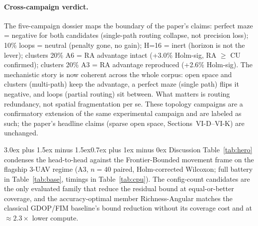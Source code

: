 \documentclass[journal]{IEEEtran}
\makeatletter
\newcommand{\FB}{Frontier-Bounded}
\newcommand{\RA}{Richness-Angular}
\renewcommand{\section}{\@startsection{section}{1}{\z@}%
{3.0ex plus 1.5ex minus 1.5ex}{0.7ex plus 1ex minus 0ex}%
{\normalfont\large\bfseries\scshape\centering}}
\makeatother
\begin{document}
\paragraph{Cross-campaign verdict.}
The five-campaign dossier maps the boundary of the paper's claims: perfect
maze = negative for both candidates (single-path routing collapse, not
precision loss); 10\% loops = neutral (penalty gone, no gain); H=16 = inert
(horizon is not the lever); clusters 20\% A6 = RA advantage intact (+3.0\%
Holm-sig, RA $\geq$ CU confirmed); clusters 20\% A3 = RA advantage reproduced
(+2.6\% Holm-sig). The mechanistic story is now coherent across the whole
corpus: open space and clusters (multi-path) keep the advantage, a perfect
maze (single path) flips it negative, and loops (partial routing) sit between.
What matters is routing redundancy, not spatial fragmentation per se. These
topology campaigns are a confirmatory extension of the same experimental
campaign and are labeled as such; the paper's headline claims (sparse open
space, Sections~VI-D--VI-K) are unchanged.


\section{Discussion}
Table~\ref{tab:hero} condenses the head-to-head against the \FB{} movement
frame on the flagship 3-UAV regime (A3, $n = 40$ paired, Holm-corrected
Wilcoxon; full battery in Table~\ref{tab:base}, timings in
Table~\ref{tab:cpu}). The config-count candidates are the only evaluated
family that reduce the residual bound at equal-or-better coverage, and the
accuracy-optimal member \RA{} matches the classical GDOP/FIM baseline's bound
reduction without its coverage cost and at $\approx 2.3\times$ lower compute.
\end{document}
